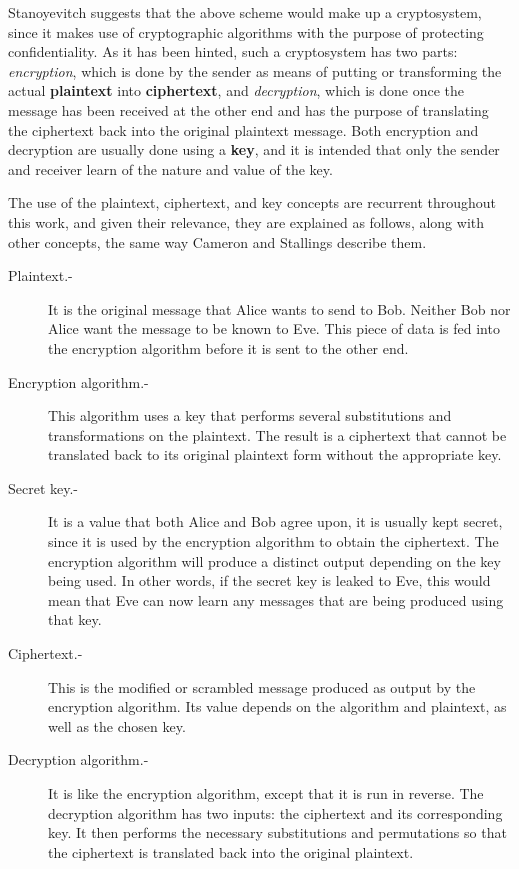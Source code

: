 Stanoyevitch \cite{IntroCryptoMath} suggests that the above scheme would make up a cryptosystem, since it makes use of cryptographic algorithms with the purpose of protecting confidentiality. As it has been hinted, such a cryptosystem has two parts: \emph{encryption}, which is done by the sender as means of putting or transforming the actual \textbf{plaintext} into \textbf{ciphertext}, and \emph{decryption}, which is done once the message has been received at the other end and has the purpose of translating the ciphertext back into the original plaintext message. Both encryption and decryption are usually done using a \textbf{key}, and it is intended that only the sender and receiver learn of the nature and value of the key. 

The use of the plaintext, ciphertext, and key concepts are recurrent throughout this work, and given their relevance, they are explained as follows, along with other concepts, the same way Cameron \cite{CryptoNotes} and Stallings \cite{CryptoStallings} describe them.
\begin{description}
\item[Plaintext.-] It is the original message that Alice wants to send to Bob. Neither Bob nor Alice want the message to be known to Eve. This piece of data is fed into the encryption algorithm before it is sent to the other end.
\item[Encryption algorithm.-] This algorithm uses a key that performs several substitutions and transformations on the plaintext. The result is a ciphertext that cannot be translated back to its original plaintext form without the appropriate key.
\item[Secret key.-] It is a value that both Alice and Bob agree upon, it is usually kept secret, since it is used by the encryption algorithm to obtain the ciphertext. The encryption algorithm will produce a distinct output depending on the key being used. In other words, if the secret key is leaked to Eve, this would mean that Eve can now learn any messages that are being produced using that key.
\item[Ciphertext.-] This is the modified or scrambled message produced as output by the encryption algorithm. Its value depends on the algorithm and plaintext, as well as the chosen key.
\item[Decryption algorithm.-] It is like the encryption algorithm, except that it is run in reverse. The decryption algorithm has two inputs: the ciphertext and its corresponding key. It then performs the necessary substitutions and permutations so that the ciphertext is translated back into the original plaintext.
\end{description}

